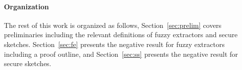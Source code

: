 \paragraph{Organization} The rest of this work is organized as follows, Section~\ref{sec:prelim} covers preliminaries including the relevant definitions of fuzzy extractors and secure sketches.  Section~\ref{sec:fe} presents the negative result for fuzzy extractors including a proof outline, and Section~\ref{sec:ss} presents the negative result for secure sketches.


